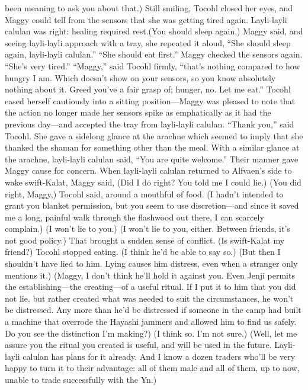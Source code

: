 \documentclass[9pt]{article}
\begin{document}
been meaning to ask you about that.)
Still smiling, Tocohl closed her eyes, and Maggy could tell from the sensors that she was getting tired
again. Layli-layli calulan was right: healing required rest.(You should sleep again,) Maggy said, and seeing layli-layli approach with a tray, she repeated it
aloud, “She should sleep again, layli-layli calulan.”
“She should eat first.”
Maggy checked the sensors again. “She’s very tired.”
“Maggy,” said Tocohl firmly, “that’s nothing compared to how hungry I am. Which doesn’t show on
your sensors, so you know absolutely nothing about it. Greed you’ve a fair grasp of; hunger, no. Let me
eat.” Tocohl eased herself cautiously into a sitting position—Maggy was pleased to note that the action
no longer made her sensors spike as emphatically as it had the previous day—and accepted the tray from
layli-layli calulan.
“Thank you,” said Tocohl. She gave a sidelong glance at the arachne which seemed to imply that she
thanked the shaman for something other than the meal. With a similar glance at the arachne, layli-layli
calulan said, “You are quite welcome.”
Their manner gave Maggy cause for concern. When layli-layli calulan returned to Alfvaen’s side to
wake swift-Kalat, Maggy said, (Did I do right? You told me I could lie.)
(You did right, Maggy,) Tocohl said, around a mouthful of food. (I hadn’t intended to grant you
blanket permission, but you seem to use discretion—and since it saved me a long, painful walk through
the flashwood out there, I can scarcely complain.)
(I won’t lie to you.)
(I won’t lie to you, either. Between friends, it’s not good policy.)
That brought a sudden sense of conflict. (Is swift-Kalat my friend?)
Tocohl stopped eating. (I think he’d be able to say so.)
(But then I shouldn’t have lied to him. Lying causes him distress, even when a stranger only mentions
it.)
(Maggy, I don’t think he’ll hold it against you. Even Jenji permits the establishing—the creating—of a
useful ritual. If I put it to him that you did not lie, but rather created what was needed to suit the
circumstances, he won’t be distressed. Any more than he’d be distressed if someone in the camp had
built a machine that overrode the Hayashi jammers and allowed him to find us safely. Do you see the
distinction I’m making?)
(I think so. I’m not sure.)
(Well, let me assure you the ritual you created is useful, and will be used in the future. Layli-layli
calulan has plans for it already. And I know a dozen traders who’ll be very happy to turn it to their
advantage: all of them male and all of them, up to now, unable to trade successfully with the Yn.)
\end{document}
